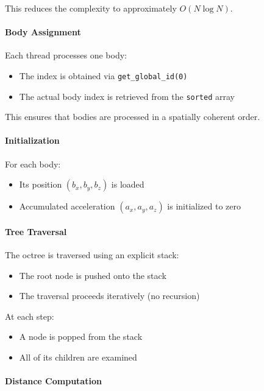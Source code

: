 \documentclass[12pt]{article}
\begin{document}
This reduces the complexity to approximately \(O(N \log N)\).

\paragraph{Body Assignment}

Each thread processes one body:

\begin{itemize}
    \item The index is obtained via \texttt{get\_global\_id(0)}
    \item The actual body index is retrieved from the \texttt{sorted} array
\end{itemize}

This ensures that bodies are processed in a spatially coherent order.

\paragraph{Initialization}

For each body:

\begin{itemize}
    \item Its position \((b_x, b_y, b_z)\) is loaded
    \item Accumulated acceleration \((a_x, a_y, a_z)\) is initialized to zero
\end{itemize}

\paragraph{Tree Traversal}

The octree is traversed using an explicit stack:

\begin{itemize}
    \item The root node is pushed onto the stack
    \item The traversal proceeds iteratively (no recursion)
\end{itemize}

At each step:
\begin{itemize}
    \item A node is popped from the stack
    \item All of its children are examined
\end{itemize}

\paragraph{Distance Computation}
\end{document}
